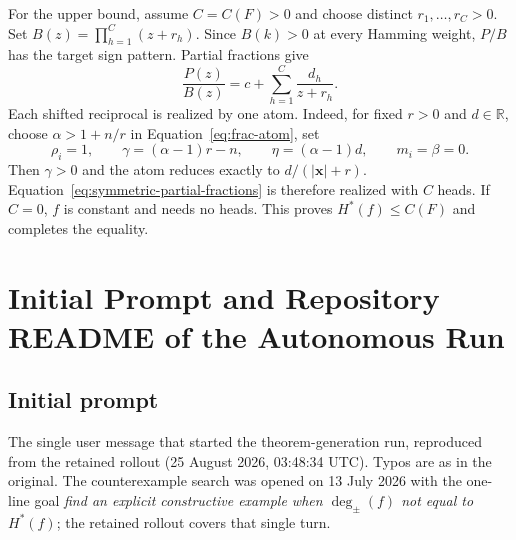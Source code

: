 \documentclass{article}
\theoremstyle{definition}
\theoremstyle{plain}
\newcommand{\hstar}{H^{\ast}}
\newcommand{\tdeg}{\deg_{\pm}}
\newcommand{\signchanges}{C(F)}
\begin{document}
For the upper bound, assume $C=\signchanges>0$ and choose distinct $r_1,\ldots,r_C>0$. Set $B(z)=\prod_{h=1}^{C}(z+r_h)$. Since $B(k)>0$ at every Hamming weight, $P/B$ has the target sign pattern. Partial fractions give
\begin{equation}
\frac{P(z)}{B(z)}=c+\sum_{h=1}^{C}\frac{d_h}{z+r_h}.
\label{eq:symmetric-partial-fractions}
\end{equation}
Each shifted reciprocal is realized by one atom. Indeed, for fixed $r>0$ and $d\in\mathbb{R}$, choose $\alpha>1+n/r$ in Equation~\eqref{eq:frac-atom}, set
\begin{equation}
\rho_i=1,\qquad
\gamma=(\alpha-1)r-n,\qquad
\eta=(\alpha-1)d,\qquad
m_i=\beta=0.
\end{equation}
Then $\gamma>0$ and the atom reduces exactly to $d/(|\mathbf{x}|+r)$. Equation~\eqref{eq:symmetric-partial-fractions} is therefore realized with $C$ heads. If $C=0$, $f$ is constant and needs no heads. This proves $\hstar(f)\leq\signchanges$ and completes the equality.

\section{Initial Prompt and Repository README of the Autonomous Run}
\label{app:prompt}

\subsection{Initial prompt}

The single user message that started the theorem-generation run, reproduced from the retained rollout (25 August 2026, 03:48:34 UTC). Typos are as in the original. The counterexample search was opened on 13 July 2026 with the one-line goal \emph{find an explicit constructive example when $\tdeg(f)$ not equal to $\hstar(f)$}; the retained rollout covers that single turn.
\end{document}
